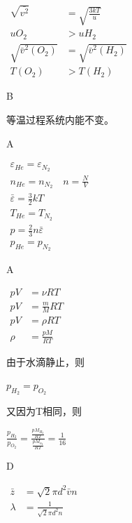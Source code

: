 \documentclass[b5paper,opensource]{./template/qyxf-book}
\begin{document}
\solve

$
\begin{aligned} \sqrt {\bar{v^{2}}} & = \sqrt { \frac { 3 k T } { u } } \\ u O _ { 2 } & > u H _ { 2 } \\ \sqrt { \bar { v } ^ { 2 } \left( O _ { 2 } \right) } & = \sqrt { \bar { v } ^ { 2 } \left( H _ { 2 } \right) } \\ T \left( O _ { 2 } \right) & > T \left( H _ { 2 } \right) \end{aligned}
$

B

\solve 等温过程系统内能不变。

A

\solve

$
\begin{array} { c } { \varepsilon _ { H e } = \varepsilon _ { N _ { 2 } } } \\ { n _ { H e } = n _ { N _ { 2 } } \quad n = \frac { N } { V } } \\ { \bar { \varepsilon } = \frac { 3 } { 2 } k T } \\ { T _ { H e } = T _ { N _ { 2 } } } \\ { p = \frac { 2 } { 3 } n \bar { \varepsilon } } \\ { p _ { H e } = p _ { N _ { 2 } } } \end{array}
$

A

\solve

$
\begin{aligned} p V & = \nu R T \\ p V & = \frac { m } { M } R T \\ p V & = \rho R T \\ \rho & = \frac { p M } { R T } \end{aligned}
$

由于水滴静止，则

$
p _ { H _ { 2 } } = p _ { O _ { 2 } }
$

又因为T相同，则

$
\frac { p _ { H _ { 2 } } } { p _ { O _ { 2 } } } = \frac { \frac { p M _ { H _ { 2 } } } { R T } } { \frac { p M _ { o _ { 2 } } } { R T } } = \frac { 1 } { 16 }
$

D

\solve

$
\begin{aligned} \bar { z } & = \sqrt { 2 } \pi d ^ { 2 } \bar { v } n \\ \lambda & = \frac { 1 } { \sqrt { 2 } \pi d ^ { 2 } n } \end{aligned}
$
\end{document}
